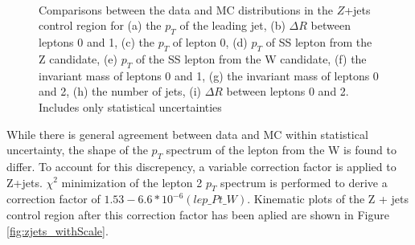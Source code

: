 \begin{figure}[H] 
    \\
    \\
    \\
    \caption{Comparisons between the data and MC distributions in the $Z$+jets control region for (a) the $p_T$ of the leading jet, (b) $\Delta R$ between leptons 0 and 1, (c) the $p_T$ of lepton 0, (d) $p_T$ of SS lepton from the Z candidate, (e) $p_T$ of the SS lepton from the W candidate, (f) the invariant mass of leptons 0 and 1, (g) the invariant mass of leptons 0 and 2, (h) the number of jets, (i) $\Delta R$ between leptons 0 and 2. Includes only statistical uncertainties}%
    \label{fig:zjets_noScale}
\end{figure}

While there is general agreement between data and MC within statistical uncertainty, the shape of the $p_T$ spectrum of the lepton from the W is found to differ. To account for this discrepency, a variable correction factor is applied to Z+jets. $\chi^2$ minimization of the lepton 2 $p_T$ spectrum is performed to derive a correction factor of $1.53 - 6.6*10^{-6} (lep\_Pt\_W)$. Kinematic plots of the Z + jets control region after this correction factor has been aplied are shown in Figure \ref{fig:zjets_withScale}.

